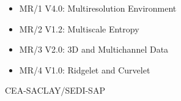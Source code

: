 \thispagestyle{empty}

\begin{center}
\vspace{1cm}
 

{\bf \Huge {}}
\vspace{2cm}

{\bf \Large
\begin{itemize}
\item{MR/1 V4.0:} Multiresolution Environment 
\item{MR/2 V1.2:} Multiscale Entropy 
\item{MR/3 V2.0:} 3D and Multichannel Data
\item{MR/4 V1.0:} Ridgelet and Curvelet
\end{itemize}
}

\vspace{1cm}
{ \large CEA-SACLAY/SEDI-SAP}

\begin{figure}[hbt]
\centerline{
\hbox{
}}
\end{figure}

\end{center}


\newpage
$ $
\newpage
\setcounter{page}{1}

{\large
\voffset 0cm
\tableofcontents
}
 
\clearpage
